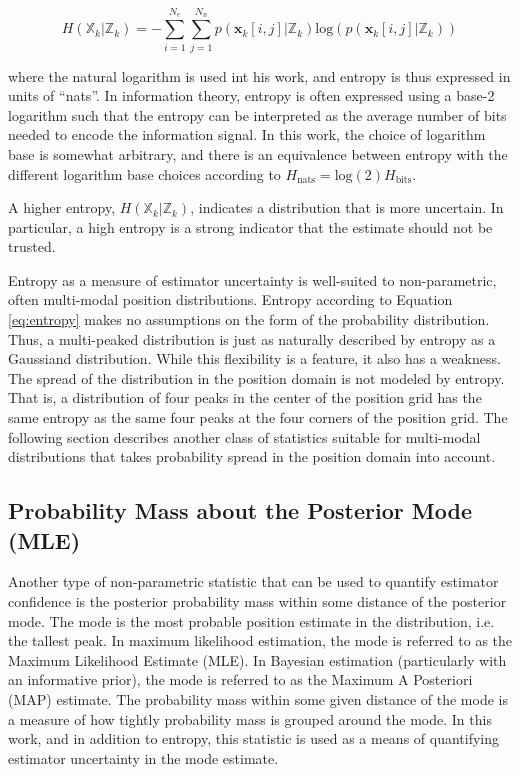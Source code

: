 \begin{equation}
H(\mathbb{X}_k | \mathbb{Z}_k) = - \sum_{i=1}^{N_e} \sum_{j=1}^{N_n} p(\mathbf{x}_k[i,j] | \mathbb{Z}_k) \text{log} ( p(\mathbf{x}_k[i,j] | \mathbb{Z}_k) )
\label{eq:entropy}
\end{equation}

\noindent where the natural logarithm is used int his work, and entropy is thus expressed in units of ``nats''.  
In information theory, entropy is often expressed using a base-2 logarithm such that the entropy can be interpreted as the average number of bits needed to encode the information signal.
In this work, the choice of logarithm base is somewhat arbitrary, and there is an equivalence between entropy with the different logarithm base choices according to $H_{\text{nats}} = \text{log}(2) H_{\text{bits}}$.

A higher entropy, $H(\mathbb{X}_k | \mathbb{Z}_k)$, indicates a distribution that is more uncertain.
In particular, a high entropy is a strong indicator that the estimate should not be trusted.

Entropy as a measure of estimator uncertainty is well-suited to non-parametric, often multi-modal position distributions.
Entropy according to Equation \ref{eq:entropy} makes no assumptions on the form of the probability distribution.
Thus, a multi-peaked distribution is just as naturally described by entropy as a Gaussiand distribution.
While this flexibility is a feature, it also has a weakness.
The spread of the distribution in the position domain is not modeled by entropy.
That is, a distribution of four peaks in the center of the position grid has the same entropy as the same four peaks at the four corners of the position grid.
The following section describes another class of statistics suitable for multi-modal distributions that takes probability spread in the position domain into account.

\subsection{Probability Mass about the Posterior Mode (MLE)}
\label{framework.Statistics.Probability}

Another type of non-parametric statistic that can be used to quantify estimator confidence is the posterior probability mass within some distance of the posterior mode.
The mode is the most probable position estimate in the distribution, i.e. the tallest peak.
In maximum likelihood estimation, the mode is referred to as the Maximum Likelihood Estimate (MLE).
In Bayesian estimation (particularly with an informative prior), the mode is referred to as the Maximum A Posteriori (MAP) estimate.
The probability mass within some given distance of the mode is a measure of how tightly probability mass is grouped around the mode.
In this work, and in addition to entropy, this statistic is used as a means of quantifying estimator uncertainty in the mode estimate.

